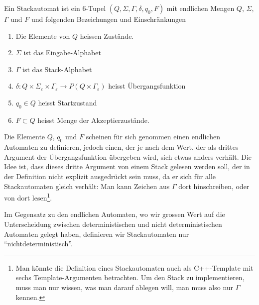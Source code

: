 \begin{definition}
%
%
Ein Stackautomat ist ein $6$-Tupel $(Q,\Sigma,\Gamma,\delta,q_0,F)$
mit endlichen Mengen $Q$, $\Sigma$, $\Gamma$ und $F$ und folgenden
Bezeichungen und Einschränkungen
\begin{enumerate}
%
\item Die Elemente von $Q$ heissen Zustände.
%
\item $\Sigma$ ist das Eingabe-Alphabet
%
\item $\Gamma$ ist das Stack-Alphabet
\item $\delta\colon Q\times \Sigma_\varepsilon\times\Gamma_\varepsilon
\to P(Q\times\Gamma_\varepsilon)$ heisst Übergangsfunktion
%
\item $q_0\in Q$ heisst Startzustand
%
\item $F\subset Q$ heisst Menge der Akzeptierzustände.
\end{enumerate}
\end{definition}
Die Elemente $Q$, $q_0$ und $F$ scheinen für sich genommen
einen endlichen Automaten zu definieren, jedoch einen, der je nach
dem Wert, der als drittes Argument der Übergangsfunktion
übergeben wird, sich etwas anders verhält. Die Idee ist, dass
dieses dritte Argument von einem Stack gelesen werden soll, der in
der Definition nicht explizit ausgedrückt sein muss, da er
sich für alle Stackautomaten gleich verhält: Man kann Zeichen
aus $\Gamma$ dort hinschreiben, oder von dort lesen\footnote{Man könnte
die Definition eines Stackautomaten auch als C++-Template mit
sechs Template-Argumenten betrachten. Um den Stack zu
implementieren, muss man nur wissen, was man darauf ablegen will,
man muss also nur $\Gamma$ kennen.}.

Im Gegensatz zu den endlichen Automaten, wo wir grossen Wert auf die
Unterscheidung zwischen deterministischen und nicht deterministischen
Automaten gelegt haben, definieren wir Stackautomaten nur
``nichtdeterministisch''.

